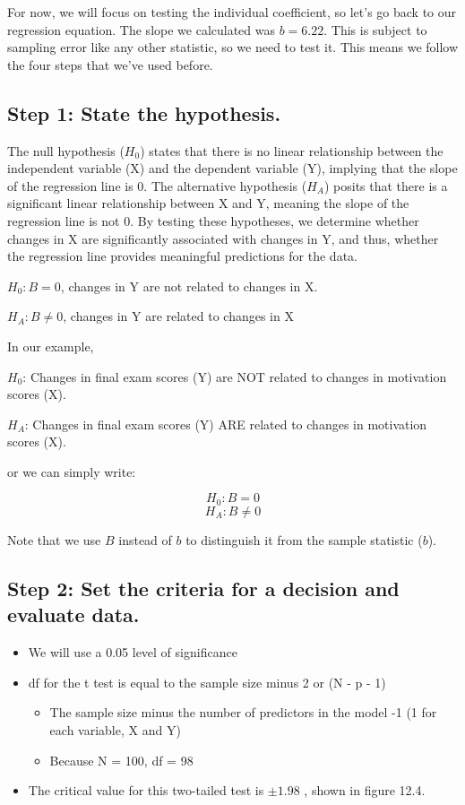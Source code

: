 \documentclass[
  letterpaper,
  DIV=11,
  numbers=noendperiod]{scrreprt}
\begin{document}
For now, we will focus on testing the individual coefficient, so let's
go back to our regression equation. The slope we calculated was
\(b = 6.22\). This is subject to sampling error like any other
statistic, so we need to test it. This means we follow the four steps
that we've used before.

\subsection*{Step 1: State the
hypothesis.}\label{step-1-state-the-hypothesis.}

The null hypothesis (\(H_0\)) states that there is no linear
relationship between the independent variable (X) and the dependent
variable (Y), implying that the slope of the regression line is 0. The
alternative hypothesis (\(H_A\)) posits that there is a significant
linear relationship between X and Y, meaning the slope of the regression
line is not 0. By testing these hypotheses, we determine whether changes
in X are significantly associated with changes in Y, and thus, whether
the regression line provides meaningful predictions for the data.

\(H_0: B = 0\), changes in Y are not related to changes in X.

\(H_A: 𝐵 \ne 0\), changes in Y are related to changes in X

In our example,

\(H_0\): Changes in final exam scores (Y) are NOT related to changes in
motivation scores (X).

\(H_A\): Changes in final exam scores (Y) ARE related to changes in
motivation scores (X).

or we can simply write:

\[
H_0: B = 0
\] \[
H_A: B \ne 0
\]

Note that we use \(B\) instead of \(b\) to distinguish it from the
sample statistic (\(b\)).

\subsection*{Step 2: Set the criteria for a decision and evaluate
data.}\label{step-2-set-the-criteria-for-a-decision-and-evaluate-data.}

\begin{itemize}
\item
  We will use a 0.05 level of significance
\item
  df for the t test is equal to the sample size minus 2 or (N - p - 1)

  \begin{itemize}
  \item
    The sample size minus the number of predictors in the model -1 (1
    for each variable, X and Y)
  \item
    Because N = 100, df = 98
  \end{itemize}
\item
  The critical value for this two-tailed test is \(\pm1.98\) , shown in
  figure 12.4.
\end{itemize}
\end{document}

